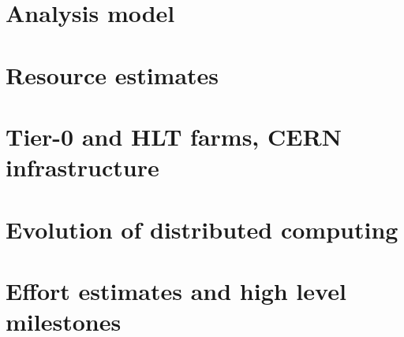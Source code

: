 \documentclass{article}[11pt]
\begin{document}
\section{Analysis model}


\section{Resource estimates}


%

\section{Tier-0 and HLT farms, CERN infrastructure}


\section{Evolution of distributed computing}


%


\section{Effort estimates and high level milestones}




\end{document}
